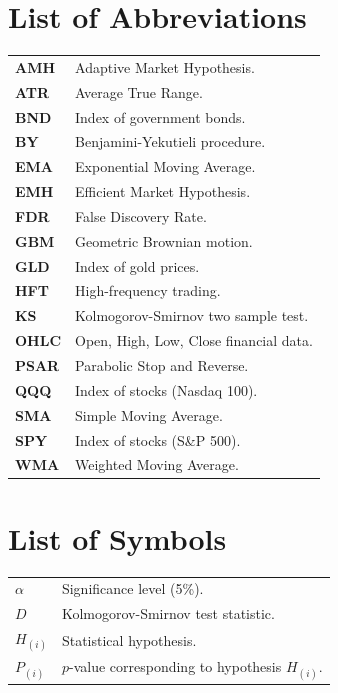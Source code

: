 \chapter{List of Abbreviations}
\begin{tabular}{ll}
  \textbf{AMH} & Adaptive Market Hypothesis.\\
  \textbf{ATR} & Average True Range.\\
  \textbf{BND} & Index of government bonds.\\
  \textbf{BY} & Benjamini-Yekutieli procedure.\\
  \textbf{EMA} & Exponential Moving Average.\\
  \textbf{EMH} & Efficient Market Hypothesis.\\
  \textbf{FDR} & False Discovery Rate.\\
  \textbf{GBM} & Geometric Brownian motion.\\
  \textbf{GLD} & Index of gold prices.\\
  \textbf{HFT} & High-frequency trading.\\
  \textbf{KS} & Kolmogorov-Smirnov two sample test.\\
  \textbf{OHLC} & Open, High, Low, Close financial data.\\
  \textbf{PSAR} & Parabolic Stop and Reverse.\\
  \textbf{QQQ} & Index of stocks (Nasdaq 100).\\
  \textbf{SMA} & Simple Moving Average.\\
  \textbf{SPY} & Index of stocks (S\&P 500).\\
  \textbf{WMA} & Weighted Moving Average.\\
\end{tabular}
\newpage

\thispagestyle{empty}
\null
\newpage

\chapter{List of Symbols}
\begin{tabular}{ll}
  $\alpha$ & Significance level (5\%).\\
  $D$ & Kolmogorov-Smirnov test statistic.\\
  $H_{(i)}$ & Statistical hypothesis.\\
  $P_{(i)}$ & $p$-value corresponding to hypothesis $H_{(i)}$.\\
\end{tabular}
\newpage

\thispagestyle{empty}
\null
\newpage
